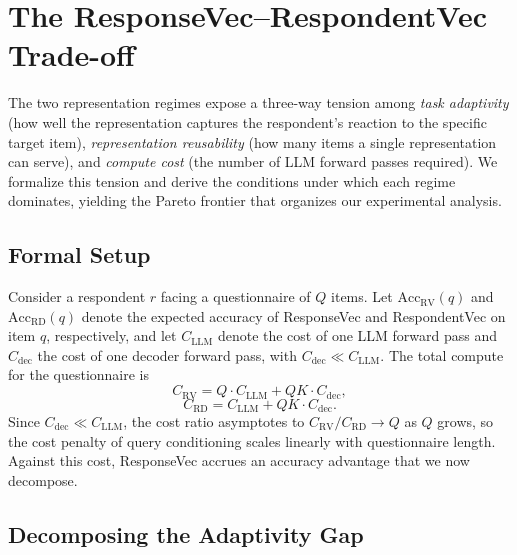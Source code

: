 \section{The ResponseVec--RespondentVec Trade-off}
\label{sec:tradeoff}

The two representation regimes expose a three-way tension among \emph{task adaptivity} (how well the representation captures the respondent's reaction to the specific target item), \emph{representation reusability} (how many items a single representation can serve), and \emph{compute cost} (the number of LLM forward passes required). We formalize this tension and derive the conditions under which each regime dominates, yielding the Pareto frontier that organizes our experimental analysis.

\subsection{Formal Setup}

Consider a respondent $r$ facing a questionnaire of $Q$ items. Let $\text{Acc}_{\text{RV}}(q)$ and $\text{Acc}_{\text{RD}}(q)$ denote the expected accuracy of ResponseVec and RespondentVec on item $q$, respectively, and let $C_{\text{LLM}}$ denote the cost of one LLM forward pass and $C_{\text{dec}}$ the cost of one decoder forward pass, with $C_{\text{dec}} \ll C_{\text{LLM}}$. The total compute for the questionnaire is
\begin{equation}
\label{eq:cost_rv}
C_{\text{RV}} = Q \cdot C_{\text{LLM}} + Q K \cdot C_{\text{dec}},
\end{equation}
\begin{equation}
\label{eq:cost_rd}
C_{\text{RD}} = C_{\text{LLM}} + Q K \cdot C_{\text{dec}}.
\end{equation}
Since $C_{\text{dec}} \ll C_{\text{LLM}}$, the cost ratio asymptotes to $C_{\text{RV}} / C_{\text{RD}} \to Q$ as $Q$ grows, so the cost penalty of query conditioning scales linearly with questionnaire length. Against this cost, ResponseVec accrues an accuracy advantage that we now decompose.

\subsection{Decomposing the Adaptivity Gap}

